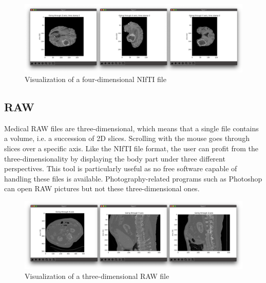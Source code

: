 \begin{figure}[!h]
\centering
\includegraphics[width=\textwidth, keepaspectratio=true]{./figures/visualize_brain_nii.png}
\caption{Visualization of a four-dimensional NIfTI file}
\label{fig:visualize_brain_nii}
\end{figure}


\subsection{RAW}
\setlength{\marginparwidth}{3cm}\leavevmode {}Medical RAW files are three-dimensional, which means that a single file contains a volume, i.e. a succession of 2D slices. Scrolling with the mouse goes through slices over a specific axis. Like the NIfTI file format, the user can profit from the three-dimensionality by displaying the body part under three different perspectives. This tool is particularly useful as no free software capable of handling these files is available. Photography-related programs such as Photoshop can open RAW pictures but not these three-dimensional ones. 

\begin{figure}[!h]
\centering
\includegraphics[width=\textwidth, keepaspectratio=true]{./figures/visualize_liver_raw.png}
\caption{Visualization of a three-dimensional RAW file}
\label{fig:visualize_liver_raw}
\end{figure}


